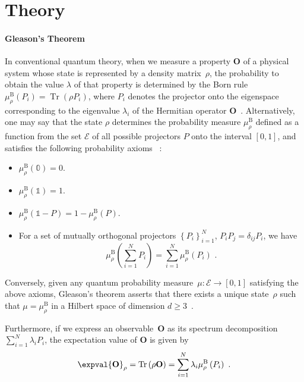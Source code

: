 \documentclass[english,reprint, aps, prl,superscriptaddress, showpacs,
showkeys, longbibliography, amsmath, amssymb]{revtex4-1}
\theoremstyle{plain}
\theoremstyle{definition}
\newcommand{\events}{\ensuremath{\mathcal{E}}}
\newcommand{\Tr}{\ensuremath{\mathop{\mathrm{Tr}}\nolimits}}
\begin{document}
\section{Theory}

\paragraph{Gleason's Theorem}

In conventional quantum theory, when we measure a property $\mathbf{O}$
of a physical system whose state is represented by a density matrix~$\rho$,
the probability to obtain the value $\lambda$ of that property is
determined by the Born rule $\mu_{\rho}^{\mathrm{B}}\left(P_{i}\right)=\Tr\left(\rho P_{i}\right)$,
where $P_{i}$ denotes the projector onto the eigenspace corresponding
to the eigenvalue $\lambda_{i}$ of the Hermitian operator $\mathbf{O}$~\cite{Born1983,peres1995quantum,544199,Jaeger2007}.
Alternatively, one may say that the state $\rho$ determines the probability
measure $\mu_{\rho}^{\mathrm{B}}$ defined as a function from the
set $\events$ of all possible projectors $P$ onto the interval $[0,1]$,
and satisfies the following probability axioms~ \cite{10.2307/2308516,gleason1957,Redhead1987-REDINA,Maassen2010}: 
\begin{itemize}
\item $\mu_{\rho}^{\mathrm{B}}(\mathbb{0})=0$. 
\item $\mu_{\rho}^{\mathrm{B}}(\mathbb{1})=1$. 
\item $\mu_{\rho}^{\mathrm{B}}\left(\mathbb{1}-P\right)=
1-\mu_{\rho}^{\mathrm{B}}\left(P\right)$. 
\item For a set of mutually orthogonal projectors $\left\{ P_{i}\right\} _{i=1}^{N}$,
$P_iP_j=\delta_{ij}P_i$,
we have 
\begin{equation}
\mu_{\rho}^{\mathrm{B}}\left(\sum_{i=1}^{N}P_{i}\right)=
\sum_{i=1}^{N}\mu_{\rho}^{\mathrm{B}}\left(P_{i}\right)
\textrm{ .}\label{eq:QuantumProbability-Addition}
\end{equation}
\end{itemize}
Conversely, given any quantum probability measure~$\mu:\events\rightarrow[0,1]$
satisfying the above axioms, Gleason's theorem asserts that there
exists a unique state~$\rho$ such that $\mu=\mu_{\rho}^{\mathrm{B}}$
in a Hilbert space of dimension $d\geq3$~\cite{gleason1957,Redhead1987-REDINA,peres1995quantum}.

Furthermore, if we express an observable~$\mathbf{O}$ as its spectrum
decomposition~$\sum_{i=1}^{N}\lambda_{i}P_{i}$, the expectation
value of $\mathbf{O}$ is given by~\cite{peres1995quantum,544199,Jaeger2007}
\begin{equation}
\expval{\mathbf{O}}_{\rho}=\Tr\left(\rho\mathbf{O}\right)=\sum_{i=1}^{N}\lambda_{i}\mu_{\rho}^{\mathrm{B}}\left(P_{i}\right)\ .\label{eq:quantum-expectation}
\end{equation}
\end{document}
